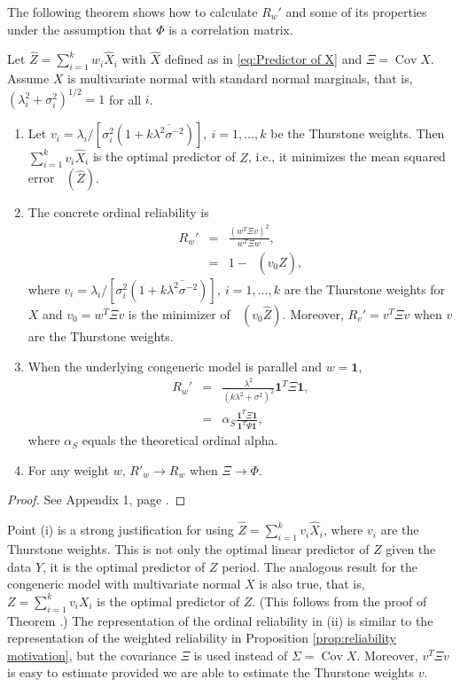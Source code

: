 \documentclass[twoside]{article}
\DeclareMathOperator{\Cov}{Cov}
\DeclareMathOperator{\MSE}{MSE_Z}
\renewcommand{\sqrt}[1]{{(#1)^{1/2}}}
\begin{document}
The following theorem shows how to calculate $ R_{w}'$ and
some of its properties under the assumption that $\Phi$ is a correlation matrix.
\begin{thm}
\label{thm:omega-prime}Let $\hat{Z}=\sum_{i=1}^{k}w_{i}\hat{X}_{i}$
with $\hat{X}$ defined as in \eqref{eq:Predictor of X} and $\Xi=\Cov\hat{X}$.
Assume $X$ is multivariate normal with standard normal marginals,
that is, $\sqrt{\lambda_{i}^{2}+\sigma_{i}^{2}}=1$ for all $i$.
\begin{enumerate}[label=(\roman*)]
\item Let  $v_{i}=\lambda_{i}/[\sigma_{i}^{2}(1+k\overline{\lambda^{2}\sigma^{-2}})],\:i=1,\ldots,k$ be the Thurstone weights. Then $\sum_{i=1}^{k}v_{i}\hat{X}_{i}$
is the optimal predictor of $Z$, i.e., it minimizes the mean squared
error $\MSE(\hat{Z})$.
\item The concrete ordinal reliability is
\begin{eqnarray}
 R_{w}' & = & \frac{(w^{T}\Xi v)^{2}}{w^{T}\Xi w},\label{eq:Omega prime}\\
 & = & 1-\MSE(v_{0}\hat{Z}),\nonumber 
\end{eqnarray}
where $v_{i}=\lambda_{i}/[\sigma_{i}^{2}(1+k\overline{\lambda^{2}\sigma^{-2}})],\:i=1,\ldots,k$
are the Thurstone weights for $X$ and $v_{0}=w^{T}\Xi v$ is the
minimizer of $\MSE(v_{0}\hat{Z})$. Moreover, $ R_{v}'=v^{T}\Xi v$ when $v$
are the Thurstone weights.
\item When the underlying congeneric model is parallel and $w=\boldsymbol{1}$,
\begin{eqnarray}
 R_{w}' & = & \frac{\lambda^{2}}{(k\lambda^{2}+\sigma^{2})^{2}}\boldsymbol{1}^{T}\Xi\boldsymbol{1},\label{eq:Alpha prime}\\
 & = & \alpha_S\frac{\boldsymbol{1}^{T}\Xi\boldsymbol{1}}{\boldsymbol{1}^{T}\Psi\boldsymbol{1}},\nonumber 
\end{eqnarray}
where $\alpha_S$ equals the theoretical ordinal alpha.
\item For any weight $w$, $ R'_{w}\to R_{w}$ when $\Xi\to\Phi$. 
\end{enumerate}
\end{thm}

\begin{proof}
See Appendix 1, page \pageref{proof:omega-prime}.
\end{proof}
Point (i) is a strong justification for using $\hat{Z}=\sum_{i=1}^{k}v_{i}\hat{X}_{i}$,
where $v_{i}$ are the Thurstone weights. This is not only the optimal
linear predictor of $Z$ given the data $Y$, it is the optimal predictor
of $Z$ period. The analogous result for the congeneric model with
multivariate normal $X$ is also true, that is, $Z=\sum_{i=1}^{k}v_{i}X_{i}$
is the optimal predictor of $Z$. (This follows from the proof of
Theorem \pageref{thm:omega-prime}.) The representation of the ordinal
reliability in (ii) is similar to the representation of the weighted
reliability in Proposition \ref{prop:reliability motivation}, but the covariance $\Xi$ is used
instead of $\Sigma = \Cov X$. Moreover, $v^{T}\Xi v$ is easy to estimate
provided we are able to estimate the Thurstone weights $v$. 
\end{document}
